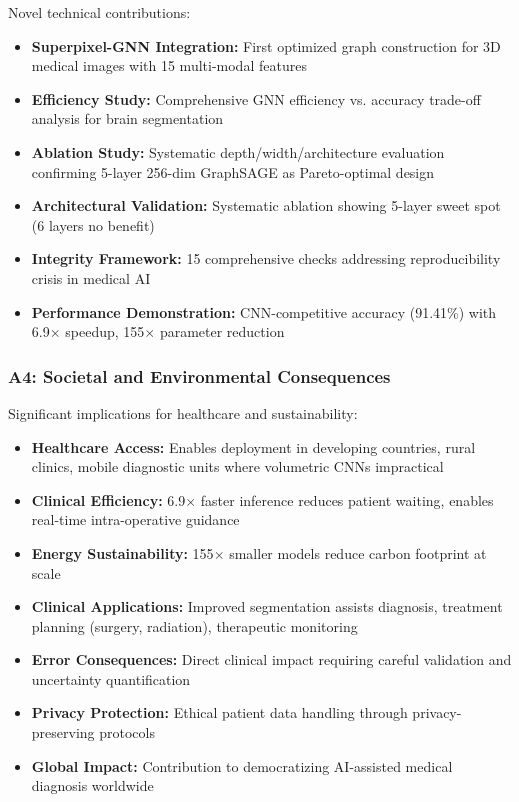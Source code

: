Novel technical contributions:

\begin{itemize}
    \item \textbf{Superpixel-GNN Integration:} First optimized graph construction for 3D medical images with 15 multi-modal features
    \item \textbf{Efficiency Study:} Comprehensive GNN efficiency vs. accuracy trade-off analysis for brain segmentation
    \item \textbf{Ablation Study:} Systematic depth/width/architecture evaluation confirming 5-layer 256-dim GraphSAGE as Pareto-optimal design
    \item \textbf{Architectural Validation:} Systematic ablation showing 5-layer sweet spot (6 layers no benefit)
    \item \textbf{Integrity Framework:} 15 comprehensive checks addressing reproducibility crisis in medical AI
    \item \textbf{Performance Demonstration:} CNN-competitive accuracy (91.41\%) with 6.9$\times$ speedup, 155$\times$ parameter reduction
\end{itemize}

\subsubsection*{A4: Societal and Environmental Consequences}

Significant implications for healthcare and sustainability:

\begin{itemize}
    \item \textbf{Healthcare Access:} Enables deployment in developing countries, rural clinics, mobile diagnostic units where volumetric CNNs impractical
    \item \textbf{Clinical Efficiency:} 6.9$\times$ faster inference reduces patient waiting, enables real-time intra-operative guidance
    \item \textbf{Energy Sustainability:} 155$\times$ smaller models reduce carbon footprint at scale
    \item \textbf{Clinical Applications:} Improved segmentation assists diagnosis, treatment planning (surgery, radiation), therapeutic monitoring
    \item \textbf{Error Consequences:} Direct clinical impact requiring careful validation and uncertainty quantification
    \item \textbf{Privacy Protection:} Ethical patient data handling through privacy-preserving protocols
    \item \textbf{Global Impact:} Contribution to democratizing AI-assisted medical diagnosis worldwide
\end{itemize}

